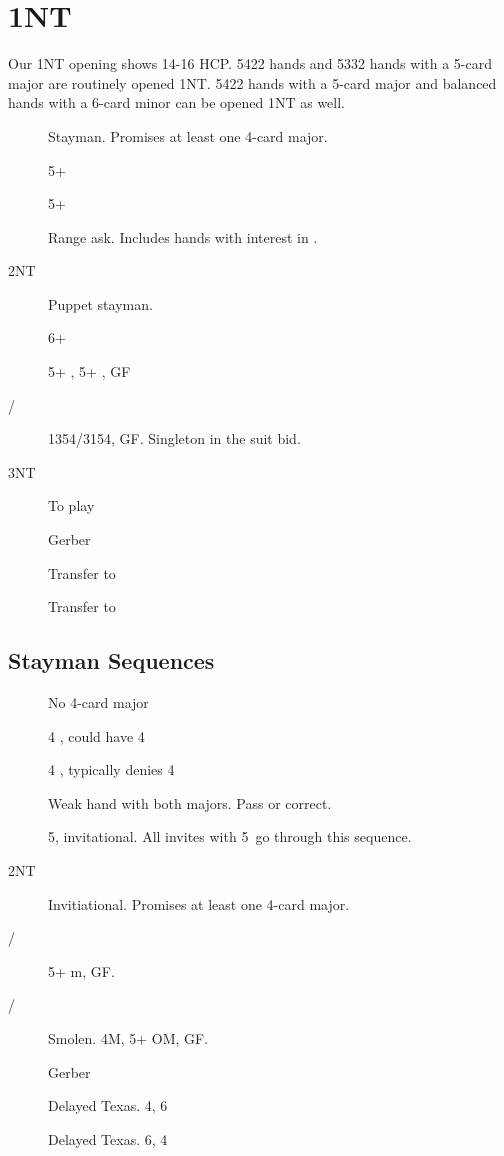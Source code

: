 \documentclass[tom-ari]{subfiles}
\begin{document}
\chapter{1NT}

Our 1NT opening shows 14-16 HCP. 5422 hands and 5332 hands with a 5-card major are routinely opened 1NT.
5422 hands with a 5-card major and balanced hands with a 6-card minor can be opened 1NT as well.

\begin{description}
  \item[] Stayman. Promises at least one 4-card major.
  \item[] 5+ \heartsuit
  \item[] 5+ \spadesuit
  \item[] Range ask. Includes hands with interest in \clubsuit.
  \item[2NT] Puppet stayman.
  \item[] 6+ \diamondsuit
  \item[] 5+ \diamondsuit, 5+ \clubsuit, GF
  \item[/] 1354/3154, GF. Singleton in the suit bid.
  \item[3NT] To play
  \item[] Gerber
  \item[] Transfer to \heartsuit
  \item[] Transfer to \spadesuit
\end{description}

\section{Stayman Sequences}

\begin{description}
  \item[] No 4-card major
  \item[] 4 \heartsuit, could have 4 \spadesuit
  \item[] 4 \spadesuit, typically denies 4 \heartsuit
\end{description}

\begin{description}
  \item[] Weak hand with both majors. Pass or correct.
  \item[] 5\spadesuit, invitational. All invites with 5\spadesuit ~go through this sequence.
  \item[2NT] Invitiational. Promises at least one 4-card major.
  \item[/] 5+ m, GF.
  \item[/] Smolen. 4M, 5+ OM, GF.
  \item[] Gerber
  \item[] Delayed Texas. 4\spadesuit, 6\heartsuit
  \item[] Delayed Texas. 6\spadesuit, 4\heartsuit
\end{description}
\end{document}
